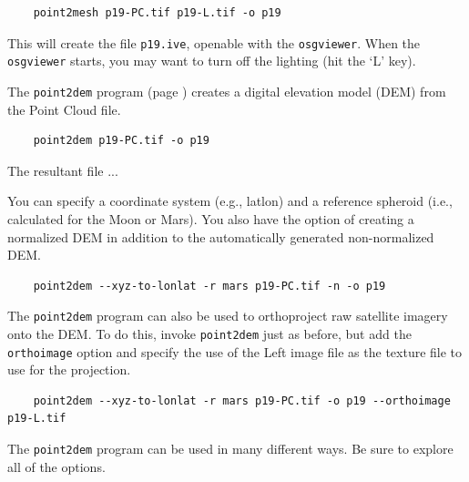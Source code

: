 \begin{verbatim}
    point2mesh p19-PC.tif p19-L.tif -o p19
\end{verbatim}

This will create the file \texttt{p19.ive}, openable with the
\texttt{osgviewer}. When the \texttt{osgviewer} starts, you may
want to turn off the lighting (hit the `L' key).

The \texttt{point2dem} program (page \pageref{point2dem}) creates
a digital elevation model (DEM) from the Point Cloud file.

\begin{verbatim}
    point2dem p19-PC.tif -o p19
\end{verbatim}

The resultant file ...

You can specify a coordinate system (e.g., latlon) and a reference
spheroid (i.e., calculated for the Moon or Mars). You also have the
option of creating a normalized DEM in addition to the automatically
generated non-normalized DEM.


\begin{verbatim}
    point2dem --xyz-to-lonlat -r mars p19-PC.tif -n -o p19
\end{verbatim}

The \texttt{point2dem} program can also be used to orthoproject raw
satellite imagery onto the DEM. To do this, invoke \texttt{point2dem}
just as before, but add the \texttt{orthoimage} option and specify
the use of the Left image file as the texture file to use for the
projection.

\begin{verbatim}
    point2dem --xyz-to-lonlat -r mars p19-PC.tif -o p19 --orthoimage p19-L.tif 
\end{verbatim}

The \texttt{point2dem} program can be used in many different ways.
Be sure to explore all of the options.


